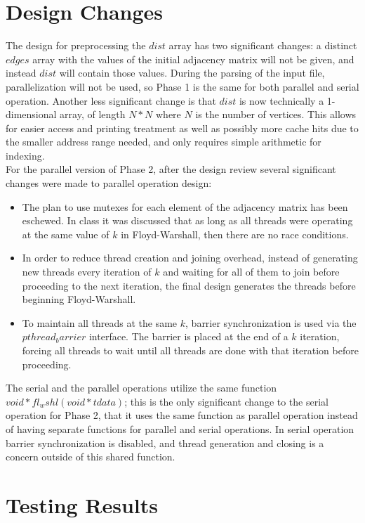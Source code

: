 \documentclass{article}
\begin{document}
\begin{adjustwidth}{-2cm}{-2cm}
\section{Design Changes}
The design for preprocessing the $dist$ array has two significant changes: a distinct $edges$ array with the values of the initial adjacency matrix will not be given, and instead $dist$ will contain those values. During the parsing of the input file, parallelization will not be used, so Phase 1 is the same for both parallel and serial operation. Another less significant change is that $dist$ is now technically a 1-dimensional array, of length $N*N$ where $N$ is the number of vertices. This allows for easier access and printing treatment as well as possibly more cache hits due to the smaller address range needed, and only requires simple arithmetic for indexing.\\
For the parallel version of Phase 2, after the design review several significant changes were made to parallel operation design:
\begin{itemize}
	\item The plan to use mutexes for each element of the adjacency matrix has been eschewed. In class it was discussed that as long as all threads were operating at the same value of $k$ in Floyd-Warshall, then there are no race conditions.
	\item In order to reduce thread creation and joining overhead, instead of generating new threads every iteration of $k$ and waiting for all of them to join before proceeding to the next iteration, the final design generates the threads before beginning Floyd-Warshall.
	\item To maintain all threads at the same $k$, barrier synchronization is used via the $pthread_barrier$ interface. The barrier is placed at the end of a $k$ iteration, forcing all threads to wait until all threads are done with that iteration before proceeding.
\end{itemize}
The serial and the parallel operations utilize the same function $void* fl_wshl(void* tdata)$; this is the only significant change to the serial operation for Phase 2, that it uses the same function as parallel operation instead of having separate functions for parallel and serial operations. In serial operation barrier synchronization is disabled, and thread generation and closing is a concern outside of this shared function.

\section{Testing Results}

\end{adjustwidth}
\end{document}
